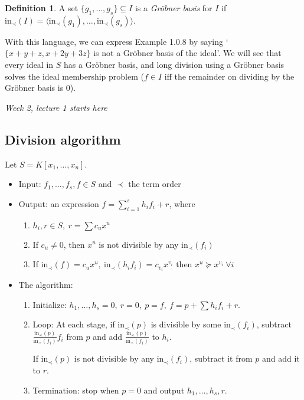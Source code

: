 \documentclass[a4paper]{article}
\newcommand{\In}{\text{in}}
\theoremstyle{definition}
\newtheorem{defn}{Definition}[subsection]
\begin{document}
\begin{defn}
A set $\{g_1,\ldots,g_s\}\subseteq I$ is a \textit{Gröbner basis} for $I$ if $\In_\prec (I)=\langle \In_\prec (g_1),\ldots,\In_\prec (g_s)\rangle$.
\end{defn}
With this language, we can express Example 1.0.8 by saying `$\{x+y+z,x+2y+3z\}$ is not a Gröbner basis of the ideal'. We will see that every ideal in $S$ has a Gröbner basis, and long division using a Gröbner basis solves the ideal membership problem ($f\in I$ iff the remainder on dividing by the Gröbner basis is 0).

\begin{flushright}
\textit{Week 2, lecture 1 starts here}
\end{flushright}

\subsection{Division algorithm}
Let $S=K[x_1,\ldots,x_n]$.
\begin{itemize}
\item Input: $f_1,\ldots,f_s,f\in S$ and $\prec$ the term order
\item Output: an expression $f=\sum_{i=1}^s h_i f_i+r$, where
\begin{enumerate}
\item $h_i,r\in S,\ r=\sum c_u x^u$
\item If $c_u\neq 0$, then $x^u$ is not divisible by any $\In_\prec (f_i)$
\item If $\In_\prec(f)=c_u x^u,\ \In_\prec(h_i f_i)=c_{v_i}x^{v_i}$ then $x^u\succeq x^{v_i} \ \forall i$
\end{enumerate}
\item The algorithm:\begin{enumerate}
\item Initialize: $h_1,\ldots,h_s=0,\ r=0,\ p=f,\ f=p+\sum h_i f_i+r$.
\item Loop: At each stage, if $\In_\prec(p)$ is divisible by some $\In_\prec(f_i)$, subtract $\frac{\In_\prec(p)}{\In_\prec(f_i)}f_i$ from $p$ and add $\frac{\In_\prec(p)}{\In_\prec(f_i)}$ to $h_i$.

If $\In_\prec(p)$ is not divisible by any $\In_\prec(f_i)$, subtract it from $p$ and add it to $r$.
\item Termination: stop when $p=0$ and output $h_1,\ldots,h_s,r$.
\end{enumerate}
\end{itemize}
\end{document}

